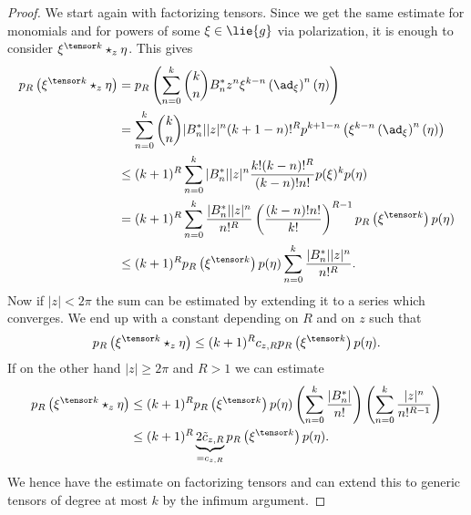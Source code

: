 \begin{proof}
    We start again with factorizing tensors. Since we get the same estimate 
    for monomials and for powers of some $\xi \in \lie{g}$ via polarization, 
    it is enough to consider $\xi^{\tensor k} \ostar_z \eta$. This gives
    \begin{align*}
        p_R \left( \xi^{\tensor k} \ostar_z \eta \right)
        & =
        p_R \left(
        \sum\limits_{n=0}^k
        \binom{k}{n} B_n^* z^n \xi^{k-n}
        \left( \ad_\xi \right)^n (\eta)
        \right)
        \\
        & =
        \sum\limits_{n=0}^k
        \binom{k}{n} |B_n^*| |z|^n
        (k + 1 - n)!^R
        p^{k + 1 - n} 
        \left(
         	\xi^{k-n}
         	\left( \ad_\xi \right)^n (\eta)
        \right)
        \\
        & \leq
        (k + 1)^R
        \sum\limits_{n=0}^k
        |B_n^*| |z|^n
        \frac{k! (k - n)!^R}{(k - n)! n!}
        p(\xi)^k p(\eta)
        \\
        & =
        (k + 1)^R
        \sum\limits_{n=0}^k
        \frac{|B_n^*| |z|^n}{n!^R}
        \left( \frac{(k - n)! n!}{k!} \right)^{R - 1}
        p_R \left( \xi^{\tensor k} \right) p(\eta)
        \\
        & \leq
        (k + 1)^R
        p_R \left( \xi^{\tensor k} \right) p(\eta)
        \sum\limits_{n=0}^k
        \frac{|B_n^*| |z|^n}{n!^R}.
    \end{align*}
    Now if $|z| < 2 \pi$ the sum can be estimated by extending it to a
    series which converges. We end up with a constant depending on $R$
    and on $z$ such that
    \begin{equation*}
        p_R \left( \xi^{\tensor k} \ostar_z \eta \right)
        \leq
        (k + 1)^R c_{z, R}
        p_R \left( \xi^{\tensor k} \right) p(\eta).
    \end{equation*}
    If on the other hand $|z| \geq 2 \pi$ and $R > 1$ we can estimate
    \begin{align*}
        p_R \left( \xi^{\tensor k} \ostar_z \eta \right)
        &\leq
        (k + 1)^R
        p_R \left( \xi^{\tensor k} \right) p(\eta)
        \left(
        \sum\limits_{n=0}^k
        \frac{|B_n^*|}{n!}
        \right) \left(
        \sum\limits_{n=0}^k
        \frac{|z|^n}{n!^{R - 1}}
        \right)
        \\
        &\leq
        (k + 1)^R
        \underbrace{2 \tilde{c}_{z,R}}_{= c_{z,R}}
        p_R \left( \xi^{\tensor k} \right) p(\eta).
    \end{align*}
    We hence have the estimate on factorizing tensors and can extend
    this to generic tensors of degree at most $k$ by the infimum argument.
\end{proof}


